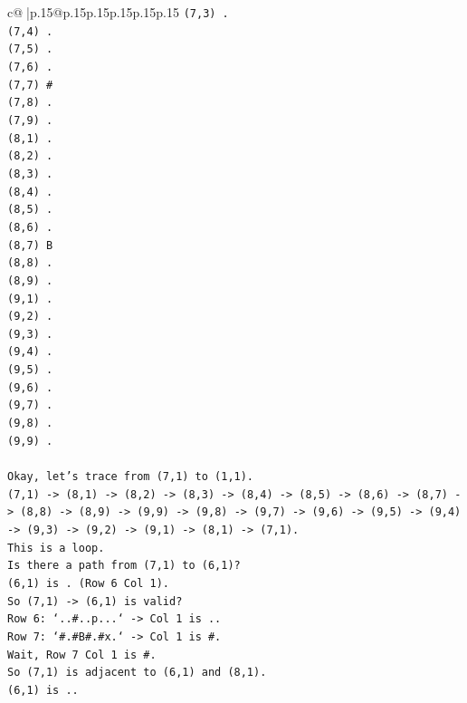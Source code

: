 \documentclass{article}
\begin{document}
{\begin{supertabular}{c@{$\;$}|p{.15\linewidth}@{}p{.15\linewidth}p{.15\linewidth}p{.15\linewidth}p{.15\linewidth}p{.15\linewidth}}
{{{\texttt{(7,3) .} \\
\texttt{(7,4) .} \\
\texttt{(7,5) .} \\
\texttt{(7,6) .} \\
\texttt{(7,7) \#} \\
\texttt{(7,8) .} \\
\texttt{(7,9) .} \\
\texttt{(8,1) .} \\
\texttt{(8,2) .} \\
\texttt{(8,3) .} \\
\texttt{(8,4) .} \\
\texttt{(8,5) .} \\
\texttt{(8,6) .} \\
\texttt{(8,7) B} \\
\texttt{(8,8) .} \\
\texttt{(8,9) .} \\
\texttt{(9,1) .} \\
\texttt{(9,2) .} \\
\texttt{(9,3) .} \\
\texttt{(9,4) .} \\
\texttt{(9,5) .} \\
\texttt{(9,6) .} \\
\texttt{(9,7) .} \\
\texttt{(9,8) .} \\
\texttt{(9,9) .} \\
\\ 
\texttt{Okay, let's trace from (7,1) to (1,1).} \\
\texttt{(7,1) {-}> (8,1) {-}> (8,2) {-}> (8,3) {-}> (8,4) {-}> (8,5) {-}> (8,6) {-}> (8,7) {-}> (8,8) {-}> (8,9) {-}> (9,9) {-}> (9,8) {-}> (9,7) {-}> (9,6) {-}> (9,5) {-}> (9,4) {-}> (9,3) {-}> (9,2) {-}> (9,1) {-}> (8,1) {-}> (7,1).} \\
\texttt{This is a loop.} \\
\texttt{Is there a path from (7,1) to (6,1)?} \\
\texttt{(6,1) is . (Row 6 Col 1).} \\
\texttt{So (7,1) {-}> (6,1) is valid?} \\
\texttt{Row 6: `..\#..p...` {-}> Col 1 is ..} \\
\texttt{Row 7: `\#.\#B\#.\#x.` {-}> Col 1 is \#.} \\
\texttt{Wait, Row 7 Col 1 is \#.} \\
\texttt{So (7,1) is adjacent to (6,1) and (8,1).} \\
\texttt{(6,1) is ..} \\
}}}
\end{supertabular}}
\end{document}
